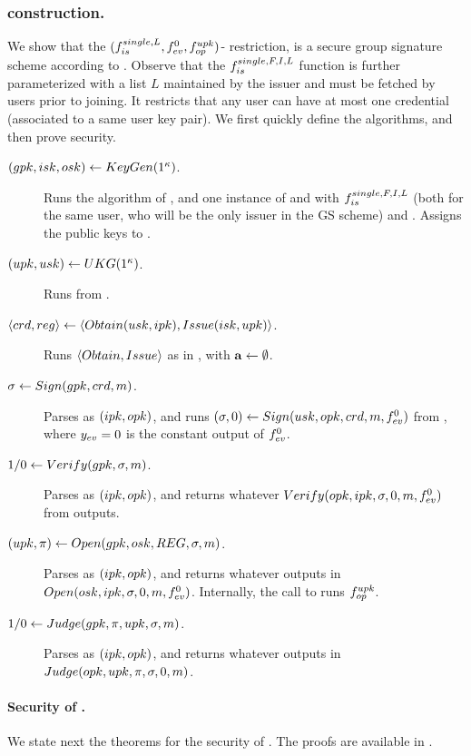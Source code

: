 \subsubsection{\CUASGS construction.} %
We show that the $(f_{is}^{single,L},f_{ev}^0,f_{op}^{upk})$-\CUASGen
restriction, is a secure group signature scheme according to \cite{bsz05}.
Observe that the $f_{is}^{single,F,I,L}$ function is further parameterized with
a list $L$ maintained by the issuer and must be fetched by users prior to
joining. It restricts that any user can have at most one credential (associated
to a same user key pair). We first quickly define the algorithms, and then
prove security.

\begin{description}
\item[$(gpk,isk,osk) \gets KeyGen(1^\kappa)$.] Runs the \Setup algorithm
  of \CUASGen, and one instance of \KeyGen and \ISet with
  $f_{is}^{single,F,I,L}$ (both for the same user, who will be the only issuer
  in the GS scheme) and \OKeyGen. Assigns the public keys to \gpk.
\item[$(upk,usk) \gets UKG(1^\kappa)$.] Runs \KeyGen from \CUASGen.
\item[$\langle crd,reg \rangle \gets
  \langle Obtain(usk,ipk),Issue(isk,upk)\rangle$.] Runs $\langle Obtain,
  Issue\rangle$ as in \CUASGen, with $\mathbf{a} \gets \emptyset$.
\item[$\sigma \gets Sign(gpk,crd,m)$.] Parses \gpk as $(ipk,opk)$, and
  runs $(\sigma,0) \gets Sign(usk,opk,crd,m,f_{ev}^0)$ from \CUASGen,
  where $y_{ev} = 0$ is the constant output of $f_{ev}^0$.
\item[$1/0 \gets Verify(gpk,\sigma,m)$.] Parses \gpk as $(ipk,opk)$, and
  returns whatever $Verify(opk,ipk,\sigma,0,m,f_{ev}^0)$ from \CUASGen
  outputs.
\item[$(\upk,\pi) \gets \Open(\gpk,\osk,\trans,\sig,\msg)$.] Parses \gpk as
  $(ipk,opk)$, and returns whatever \CUASGen outputs in $Open(osk,ipk,\sigma,
  0,m,f_{ev}^0)$. Internally, the call to \Open runs $f_{op}^{upk}$.
\item[$1/0 \gets Judge(gpk,\pi,upk,\sigma,m)$.] Parses \gpk as $(ipk,
  opk)$, and returns whatever \CUASGen outputs in $Judge(opk,upk,\pi,\sigma,
  0,m)$.
\end{description}

\paragraph{Security of \CUASGS.} %
We state next the theorems for the security of \CUASGS. The proofs are available
in .

